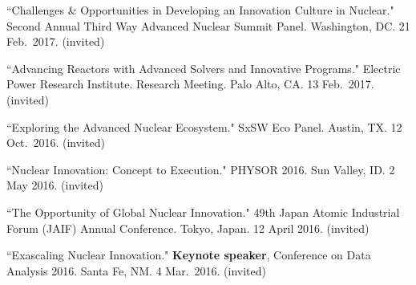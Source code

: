 \begin{bibsection}

\item ``Challenges \& Opportunities in Developing an Innovation Culture in Nuclear." Second Annual Third Way Advanced Nuclear Summit Panel. Washington, DC. 21 Feb.\ 2017. (invited)

\item ``Advancing Reactors with Advanced Solvers and Innovative Programs." Electric Power Research Institute. Research Meeting. Palo Alto, CA. 13 Feb.\ 2017. (invited)

\item ``Exploring the Advanced Nuclear Ecosystem." SxSW Eco Panel. Austin, TX. 12 Oct.\ 2016. (invited)




\item ``Nuclear Innovation: Concept to Execution." PHYSOR 2016. Sun Valley, ID. 2 May 2016. (invited)


\item ``The Opportunity of Global Nuclear Innovation." 49th Japan Atomic Industrial Forum (JAIF) Annual Conference. Tokyo, Japan. 12 April 2016. (invited)

\item ``Exascaling Nuclear Innovation." \textbf{Keynote speaker}, Conference on Data Analysis 2016. Santa Fe, NM. 4 Mar.\ 2016. (invited) 



\end{bibsection}
